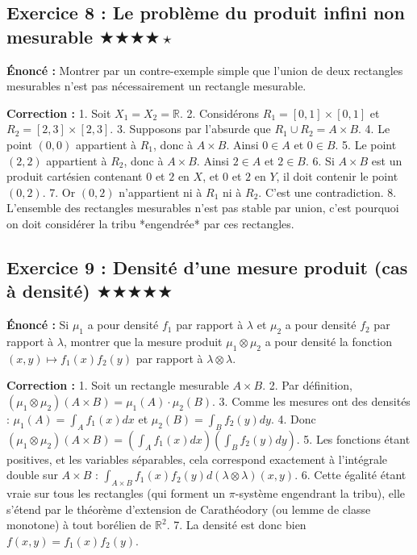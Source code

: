 \documentclass[11pt,a4paper]{article}
\begin{document}
\subsection*{Exercice 8 : Le problème du produit infini non mesurable \quad $\bigstar\bigstar\bigstar\bigstar\star$}

\textbf{Énoncé :}
Montrer par un contre-exemple simple que l'union de deux rectangles mesurables n'est pas nécessairement un rectangle mesurable.

\textbf{Correction :}
1. Soit $X_1 = X_2 = \mathbb{R}$.
2. Considérons $R_1 = [0, 1] \times [0, 1]$ et $R_2 = [2, 3] \times [2, 3]$.
3. Supposons par l'absurde que $R_1 \cup R_2 = A \times B$.
4. Le point $(0, 0)$ appartient à $R_1$, donc à $A \times B$. Ainsi $0 \in A$ et $0 \in B$.
5. Le point $(2, 2)$ appartient à $R_2$, donc à $A \times B$. Ainsi $2 \in A$ et $2 \in B$.
6. Si $A \times B$ est un produit cartésien contenant $0$ et $2$ en $X$, et $0$ et $2$ en $Y$, il doit contenir le point $(0, 2)$.
7. Or $(0, 2)$ n'appartient ni à $R_1$ ni à $R_2$. C'est une contradiction.
8. L'ensemble des rectangles mesurables n'est pas stable par union, c'est pourquoi on doit considérer la tribu *engendrée* par ces rectangles.

\subsection*{Exercice 9 : Densité d'une mesure produit (cas à densité) \quad $\bigstar\bigstar\bigstar\bigstar\bigstar$}

\textbf{Énoncé :}
Si $\mu_1$ a pour densité $f_1$ par rapport à $\lambda$ et $\mu_2$ a pour densité $f_2$ par rapport à $\lambda$, montrer que la mesure produit $\mu_1 \otimes \mu_2$ a pour densité la fonction $(x,y) \mapsto f_1(x)f_2(y)$ par rapport à $\lambda \otimes \lambda$.

\textbf{Correction :}
1. Soit un rectangle mesurable $A \times B$.
2. Par définition, $(\mu_1 \otimes \mu_2)(A \times B) = \mu_1(A) \cdot \mu_2(B)$.
3. Comme les mesures ont des densités : $\mu_1(A) = \int_A f_1(x) dx$ et $\mu_2(B) = \int_B f_2(y) dy$.
4. Donc $(\mu_1 \otimes \mu_2)(A \times B) = \left( \int_A f_1(x) dx \right) \left( \int_B f_2(y) dy \right)$.
5. Les fonctions étant positives, et les variables séparables, cela correspond exactement à l'intégrale double sur $A \times B$ :
   $\int_{A \times B} f_1(x)f_2(y) d(\lambda \otimes \lambda)(x,y)$.
6. Cette égalité étant vraie sur tous les rectangles (qui forment un $\pi$-système engendrant la tribu), elle s'étend par le théorème d'extension de Carathéodory (ou lemme de classe monotone) à tout borélien de $\mathbb{R}^2$.
7. La densité est donc bien $f(x,y) = f_1(x)f_2(y)$.
\end{document}
